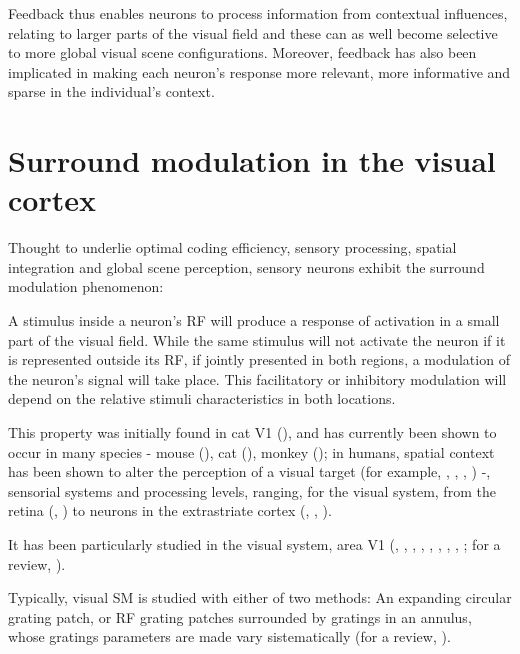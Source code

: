 Feedback thus enables neurons to process information from contextual influences, relating to larger parts of the visual field and these can as well become selective to more global visual scene configurations. Moreover, feedback has also been implicated in making each neuron's response more relevant, more informative and sparse in the individual's context.



\section{Surround modulation in the visual cortex}

Thought to underlie optimal coding efficiency, sensory processing, spatial integration and global scene perception, sensory neurons exhibit the surround modulation phenomenon: 

A stimulus inside a neuron's RF will produce a response of activation in a small part of the visual field. While the same stimulus will not activate the neuron if it is represented outside its RF, if jointly presented in both regions, a modulation of the neuron's signal will take place. This facilitatory or inhibitory modulation will depend on the relative stimuli characteristics in both locations. 

This property was initially found in cat V1 (\cite{Hubel1965}), and has currently been shown to occur in many species - mouse (\cite{Bergh2010}), cat (\cite{Blakemore1972}), monkey (\cite{Cavanaugh2002a}); in humans, spatial context has been shown to alter the perception of a visual target (for example, \cite{Chubb1989}, \cite{Cannon1991}, \cite{Meese2004}, \cite{Nurminen2009}) -, sensorial systems and processing levels, ranging, for the visual system, from the retina (\cite{McIlwain1964}, \cite{Solomon2006}) to neurons in the extrastriate cortex (\cite{Allman1985}, \cite{Desimone1987}, \cite{Born2005}). 

It has been particularly studied in the visual system, area V1 (\cite{Hubel1965}, \cite{Blakemore1972}, \cite{Maffei1976}, \cite{Gilbert1977}, \cite{Nelson1978}, \cite{Sceniak2001}, \cite{Cavanaugh2002a}, \cite{Bergh2010}, \cite{Angelucci2013}; for a review, \cite{Angelucci2017}).

Typically, visual SM is studied with either of two methods: An expanding circular grating patch, or RF grating patches surrounded by gratings in an annulus, whose gratings parameters are made vary sistematically (for a review, \cite{Angelucci2014}).

